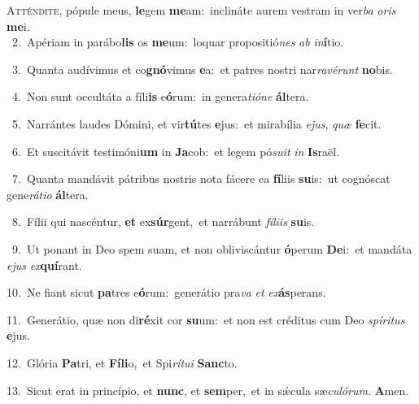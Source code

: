 \lettrine{\initial\textcolor{\initialcolor}{A}}{tténdite,} pópule meus, \textbf{le}\-gem \textbf{me}\-am:~\star inclináte aurem vestram in ver\textit{ba} \textit{o}\-\textit{ris} \textbf{me}\-i.\\
{\numbfont\textcolor{\numbcolor}{~2.}}~Apériam in parábo\textbf{lis} os \textbf{me}\-um:~\star loquar propositió\textit{nes} \textit{ab} \textit{in}\-\textbf{í}tio.\par
{\numbfont\textcolor{\numbcolor}{~3.}}~Quanta audívimus et co\-\textbf{gnó}\-vimus \textbf{e}\-a:~\star et patres nostri nar\-\textit{ra}\-\textit{vé}\textit{runt} \textbf{no}\-bis.\par
{\numbfont\textcolor{\numbcolor}{~4.}}~Non sunt occultáta a fíli\textbf{is} e\-\textbf{ó}\-rum:~\star in genera\-\textit{ti}\-\textit{ó}\textit{ne} \textbf{ál}\-tera.\par
{\numbfont\textcolor{\numbcolor}{~5.}}~Narrántes laudes Dómini, et vir\-\textbf{tú}\-tes \textbf{e}\-jus:~\star et mirabília \textit{e}\-\textit{jus}, \textit{quæ} \textbf{fe}\-cit.\par
{\numbfont\textcolor{\numbcolor}{~6.}}~Et suscitávit testimóni\textbf{um} in \textbf{Ja}\-cob:~\star et legem pó\-\textit{su}\-\textit{it} \textit{in} \textbf{Is}\-raël.\par
{\numbfont\textcolor{\numbcolor}{~7.}}~Quanta mandávit pátribus nostris nota fácere ea \textbf{fí}\-liis \textbf{su}\-is:~\star ut cognóscat gene\-\textit{rá}\-\textit{ti}\textit{o} \textbf{ál}\-tera.\par
{\numbfont\textcolor{\numbcolor}{~8.}}~Fílii qui nascéntur, \textbf{et} ex\-\textbf{súr}\-gent,~\star et narrábunt \textit{fí}\-\textit{li}\textit{is} \textbf{su}\-is.\par
{\numbfont\textcolor{\numbcolor}{~9.}}~Ut ponant in Deo spem suam, et non obliviscántur \textbf{ó}\-perum \textbf{De}\-i:~\star et mandáta \textit{e}\-\textit{jus} \textit{ex}\-\textbf{quí}rant.\par
{\numbfont\textcolor{\numbcolor}{10.}}~Ne fiant sicut \textbf{pa}\-tres e\-\textbf{ó}\-rum:~\star generátio pra\textit{va} \textit{et} \textit{ex}\-\textbf{ás}perans.\par
{\numbfont\textcolor{\numbcolor}{11.}}~Generátio, quæ non di\-\textbf{ré}\-xit cor \textbf{su}\-um:~\star et non est créditus cum Deo \textit{spí}\-\textit{ri}\textit{tus} \textbf{e}\-jus.\par
{\numbfont\textcolor{\numbcolor}{12.}}~Glória \textbf{Pa}\-tri, et \textbf{Fí}\-\textbf{li}o,~\star et Spi\-\textit{rí}\-\textit{tu}\textit{i} \textbf{Sanc}\-to.\par
{\numbfont\textcolor{\numbcolor}{13.}}~Sicut erat in princípio, et \textbf{nunc}\-, et \textbf{sem}\-per,~\star et in sǽcula sæ\-\textit{cu}\-\textit{ló}\textit{rum}. \textbf{A}\-men.\par
